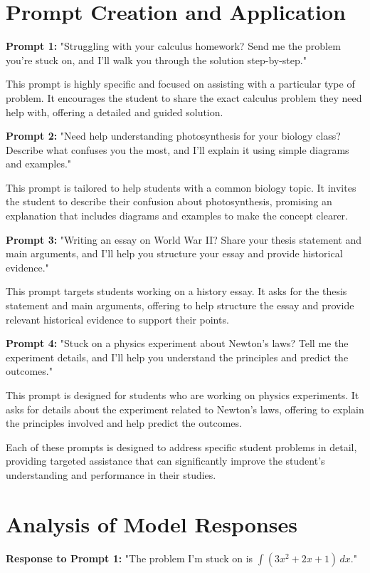 \section{Prompt Creation and Application}
\textbf{Prompt 1:} "Struggling with your calculus homework? Send me the problem you're stuck on, and I'll walk you through the solution step-by-step."

This prompt is highly specific and focused on assisting with a particular type of problem. It encourages the student to share the exact calculus problem they need help with, offering a detailed and guided solution.

\textbf{Prompt 2:} "Need help understanding photosynthesis for your biology class? Describe what confuses you the most, and I'll explain it using simple diagrams and examples."

This prompt is tailored to help students with a common biology topic. It invites the student to describe their confusion about photosynthesis, promising an explanation that includes diagrams and examples to make the concept clearer.

\textbf{Prompt 3:} "Writing an essay on World War II? Share your thesis statement and main arguments, and I'll help you structure your essay and provide historical evidence."

This prompt targets students working on a history essay. It asks for the thesis statement and main arguments, offering to help structure the essay and provide relevant historical evidence to support their points.

\textbf{Prompt 4:} "Stuck on a physics experiment about Newton's laws? Tell me the experiment details, and I'll help you understand the principles and predict the outcomes."

This prompt is designed for students who are working on physics experiments. It asks for details about the experiment related to Newton's laws, offering to explain the principles involved and help predict the outcomes.

Each of these prompts is designed to address specific student problems in detail, providing targeted assistance that can significantly improve the student's understanding and performance in their studies.

\section{Analysis of Model Responses}
\textbf{Response to Prompt 1:} "The problem I'm stuck on is \(\int (3x^2 + 2x + 1) \, dx\)."

